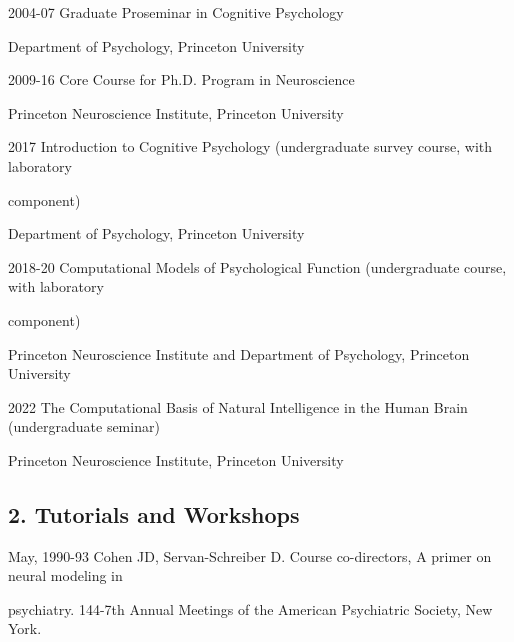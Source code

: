 \documentclass[10 pt]{article}
\begin{document}
2004-07 \hspace{0.3in} Graduate Proseminar in Cognitive Psychology

\hspace{0.81in} Department of Psychology, Princeton University
    \smallskip

2009-16 \hspace{0.3in} Core Course for Ph.D. Program in Neuroscience

\hspace{0.81in} Princeton Neuroscience Institute, Princeton University
    \smallskip

2017 \hspace{0.48in} Introduction to Cognitive Psychology (undergraduate survey course, with laboratory

\hspace{0.81in} component)

\hspace{0.81in} Department of Psychology, Princeton University
    \smallskip

2018-20 \hspace{0.3in} Computational Models of Psychological Function (undergraduate course, with laboratory

\hspace{0.81in} component)

\hspace{0.81in} Princeton Neuroscience Institute and Department of Psychology, Princeton University
    \smallskip

2022 \hspace{0.51in} The Computational Basis of Natural Intelligence in the Human Brain (undergraduate seminar)

\hspace{0.81in} Princeton Neuroscience Institute, Princeton University
    \smallskip

\subsection*{2. Tutorials and Workshops} \label{secTEACHING2}
    \medskip

May, 1990-93 \hspace{0.25in} Cohen JD, Servan-Schreiber D. Course co-directors, A primer on neural modeling in

\hspace{1.1in} psychiatry. 144-7th Annual Meetings of the American Psychiatric Society, New York.
\end{document}
